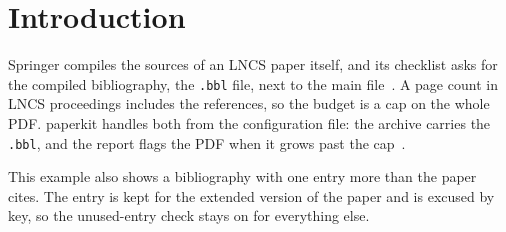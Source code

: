 \section{Introduction}

Springer compiles the sources of an LNCS paper itself, and its checklist asks
for the compiled bibliography, the \texttt{.bbl} file, next to the
main file~\cite{llncs}. A page count in LNCS proceedings includes the
references, so the budget is a cap on the whole PDF. paperkit handles both
from the configuration file: the archive carries the \texttt{.bbl}, and the
report flags the PDF when it grows past the cap~\cite{reproducible}.

This example also shows a bibliography with one entry more than the paper
cites. The entry is kept for the extended version of the paper and is excused
by key, so the unused-entry check stays on for everything else.
